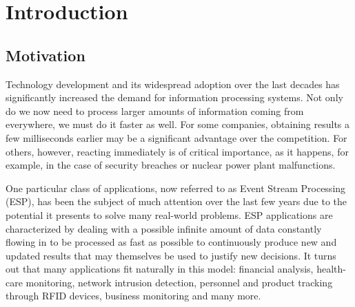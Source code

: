 \chapter{Introduction}
\label{chap:introduction}

\section{Motivation}

Technology development and its widespread adoption over the last
decades has significantly increased the demand for information
processing systems. Not only do we now need to process larger amounts
of information coming from everywhere, we must do it faster as
well. For some companies, obtaining results a few milliseconds earlier
may be a significant advantage over the competition. For others,
however, reacting immediately is of critical importance, as it
happens, for example, in the case of security breaches or nuclear
power plant malfunctions.

One particular class of applications, now referred to as Event Stream
Processing (ESP), has been the subject of much attention over the last
few years due to the potential it presents to solve many real-world
problems. ESP applications are characterized by dealing with a
possible infinite amount of data constantly flowing in to be processed
as fast as possible to continuously produce new and updated results
that may themselves be used to justify new decisions. It turns out
that many applications fit naturally in this model: financial
analysis, health-care monitoring, network intrusion detection,
personnel and product tracking through RFID devices, business
monitoring and many more.

